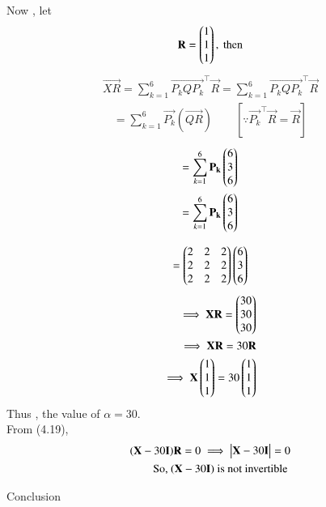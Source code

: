 \documentclass{beamer}
\begin{document}
\begin{frame}
  Now , let
\begin{align}
\mathbf{R} = \begin{pmatrix}1\\1\\1\end{pmatrix}, \text{ then}
\end{align}
\begin{align}
\vec{XR} = \sum_{k=1}^{6} \vec{P_k Q P_k}^\top \vec{R} = \sum_{k=1}^{6} \vec{P_k Q P_k}^\top \vec{R}
\end{align}
\begin{align}
= \sum_{k=1}^{6} \vec{P_k} ( \vec{Q R}) \qquad [\because \vec{P_k}^\top \vec{R} = \vec{R}]
\end{align}
\begin{align}
= \sum_{k=1}^{6} \mathbf{P_k} \begin{pmatrix}6\\3\\6\end{pmatrix}\\
= \sum_{k=1}^{6} \mathbf{P_k} \begin{pmatrix}6\\3\\6\end{pmatrix}\\
\end{align}
\end{frame}
\begin{frame}
\begin{align}
    = \begin{pmatrix}2 & 2 & 2\\2 & 2 & 2\\2 & 2 & 2\end{pmatrix}\begin{pmatrix}6\\3\\6\end{pmatrix}
\end{align}
\begin{align}
\implies \mathbf{XR} = 
\begin{pmatrix}30\\30\\30\end{pmatrix}\\
\implies \mathbf{XR} = 30\mathbf{R}\\
\implies \mathbf{X}\begin{pmatrix}1\\1\\1\end{pmatrix} = 30\begin{pmatrix}1\\1\\1\end{pmatrix}
\end{align}
Thus , the value of $ \alpha = 30$.\\
From (4.19),
\begin{align}
 (\mathbf{X} - 30\mathbf{I})\mathbf{R} = 0 \implies \begin{vmatrix}\mathbf{X}-30\mathbf{I}\end{vmatrix} = 0 \\
\text{So, } (\mathbf{X} - 30\mathbf{I}) \text{ is not invertible }
\end{align}
\end{frame}
\begin{frame}{Conclusion}
\end{frame}
\end{document}
